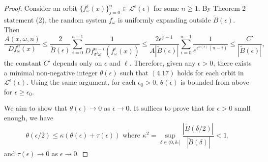 \documentclass[11pt,oneside]{article}
\theoremstyle{plain}
\numberwithin{equation}{section}
\numberwithin{figure}{section}
\numberwithin{table}{section}
\begin{document}
\begin{proof}


Consider an orbit $\{f_{\omega}^j(x) \}_{j = 0}^{n} \in \mathcal L^{\epsilon}(\epsilon)$ for some $n \geq 1$. By Theorem 2 statement (2), the random system $f_{\omega}$ is uniformly expanding outside $\tilde B(\epsilon)$. Then
\[
\frac{A(x, \omega, n) }{Df_{\omega}^n(x)} \leq \frac{2}{\tilde B(\epsilon)} \sum_{i=0}^{n-1} \frac{1}{Df_{\sigma^i \omega}^{n-i}(f_{\omega}^i(x))} \leq \frac{2 \epsilon^{\frac{1}{\ell}-1}}{A|\tilde B(\epsilon)|} \sum_{i=0}^{n-1} \frac{1}{ e^{\epsilon^{\alpha(\epsilon)}(n-i)}}  \leq \frac{C'}{|\tilde B(\epsilon)|},
\]
the constant $C'$ depends only on $\epsilon$ and $\ell$. Therefore, given any $\epsilon > 0$, there exists a minimal non-negative integer $\theta(\epsilon)$ such that $(4.17)$ holds for each orbit in $\mathcal L^{\epsilon}(\epsilon)$. Using the same argument, for each $\epsilon_0 > 0$, $\theta(\epsilon)$ is bounded from above for $\epsilon \geq \epsilon_0$. 


We aim to show that $\theta(\epsilon) \to 0$ as $\epsilon \to 0$. It suffices to prove that for $\epsilon > 0$ small enough, we have
\[
\theta(\epsilon /2) \leq \kappa (\theta(\epsilon) + \tau (\epsilon) )\mbox{ where \ } 
\kappa^2 = \sup_{\delta \in (0, \delta_*]} \frac{|\tilde B(\delta/2)|}{|\tilde B(\delta)|} < 1,
\]
and $\tau(\epsilon) \to 0$ as $\epsilon \to 0$.



\end{proof}
\end{document}
